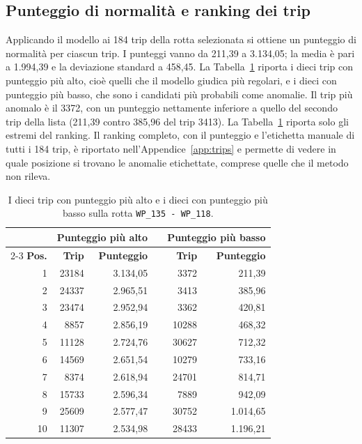 \subsection{Punteggio di normalità e ranking dei trip}\label{ssec:res_scoring}
 
Applicando il modello ai 184 trip della rotta selezionata si ottiene un punteggio di normalità per
ciascun trip. I punteggi vanno da 211,39 a 3.134,05; la media è pari a 1.994,39 e la deviazione standard
a 458,45. La Tabella~\ref{tab:res_score_ranking} riporta i dieci trip con punteggio più alto,
cioè quelli che il modello giudica più regolari, e i dieci con punteggio più basso, che sono i candidati
più probabili come anomalie. Il trip più anomalo è il 3372, con un punteggio nettamente inferiore a
quello del secondo trip della lista (211,39 contro 385,96 del trip 3413).
La Tabella~\ref{tab:res_score_ranking} riporta solo gli estremi del ranking. Il ranking completo, con il punteggio
e l'etichetta manuale di tutti i 184 trip, è riportato nell'Appendice~\ref{app:trips} e permette di vedere in quale
posizione si trovano le anomalie etichettate, comprese quelle che il metodo non rileva.

\begin{table}[htbp]
\centering
\caption{I dieci trip con punteggio più alto e i dieci con punteggio più basso sulla rotta
\texttt{WP\_135 - WP\_118}.}\label{tab:res_score_ranking}
\begin{tabular}{rrrcrr}
\toprule
& \multicolumn{2}{c}{\textbf{Punteggio più alto}} & & \multicolumn{2}{c}{\textbf{Punteggio più basso}} \\
\cmidrule{2-3} \cmidrule{5-6}
\textbf{Pos.} & \textbf{Trip} & \textbf{Punteggio} & & \textbf{Trip} & \textbf{Punteggio} \\
\midrule
1  & 23184 & 3.134,05 & & 3372  & 211,39   \\
2  & 24337 & 2.965,51 & & 3413  & 385,96   \\
3  & 23474 & 2.952,94 & & 3362  & 420,81   \\
4  & 8857  & 2.856,19 & & 10288 & 468,32   \\
5  & 11128 & 2.724,76 & & 30627 & 712,32   \\
6  & 14569 & 2.651,54 & & 10279 & 733,16   \\
7  & 8374  & 2.618,94 & & 24701 & 814,71   \\
8  & 15733 & 2.596,34 & & 7889  & 942,09   \\
9  & 25609 & 2.577,47 & & 30752 & 1.014,65 \\
10 & 11307 & 2.534,98 & & 28433 & 1.196,21 \\
\bottomrule
\end{tabular}
\end{table}

